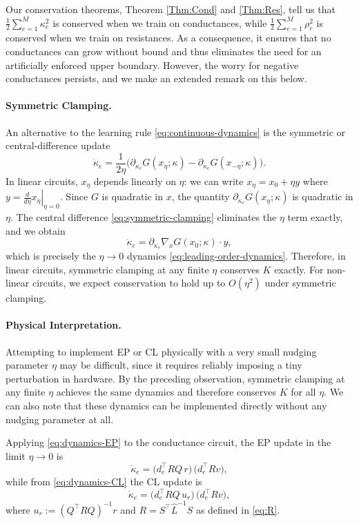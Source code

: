 \documentclass[final, 11pt, nonatbib]{elsarticle}
\theoremstyle{definition}
\theoremstyle{plain}
\numberwithin{equation}{section}
\begin{document}
Our conservation theorems, Theorem \ref{Thm:Cond} and \ref{Thm:Res}, tell us that 
$
    \frac{1}{2}\sum_{e=1}^{M} \kappa_e^2
$
is conserved when we train on conductances, while
$
    \frac{1}{2}\sum_{e=1}^{M} \rho_e^2
$
is conserved when we train on resistances. As a consequence, it ensures that no conductances can grow without bound and thus eliminates the need for an artificially enforced upper boundary. However, the worry for negative conductances persists, and we make an extended remark on this below. 
\paragraph{Symmetric Clamping.}
An alternative to the learning rule \eqref{eq:continuous-dynamics} is the symmetric or central-difference update
\begin{equation}
    \dot{\kappa}_e
    = \dfrac{1}{2\eta}\Big(\partial_{\kappa_e}G(x_\eta;\kappa) - \partial_{\kappa_e}G(x_{-\eta};\kappa)\Big).
    \label{eq:symmetric-clamping}
\end{equation}
In linear circuits, $x_\eta$ depends linearly on $\eta$: we can write $x_\eta = x_0 + \eta y$ where $y = \left.\frac{d}{d\eta}x_\eta\right|_{\eta=0}$. Since $G$ is quadratic in $x$, the quantity $\partial_{\kappa_e}G(x_\eta;\kappa)$ is quadratic in $\eta$. The central difference \eqref{eq:symmetric-clamping} eliminates the $\eta$ term exactly, and we obtain
\[
    \dot{\kappa}_e = \partial_{\kappa_e}\nabla_x G(x_0;\kappa) \cdot y,
\]
which is precisely the $\eta \to 0$ dynamics \eqref{eq:leading-order-dynamics}. Therefore, in linear circuits, symmetric clamping at any finite $\eta$ conserves $K$ exactly. For non-linear circuits, we expect conservation to hold up to $O(\eta^2)$ under symmetric clamping.

\paragraph{Physical Interpretation.}
Attempting to implement EP or CL physically with a very small nudging parameter
$\eta$ may be difficult, since it requires reliably imposing a tiny perturbation
in hardware. By the preceding observation, symmetric clamping at any finite $\eta$ achieves the same dynamics and therefore conserves $K$ for all $\eta$. We can also note that these dynamics can be implemented directly without any nudging parameter at all.

Applying \eqref{eq:dynamics-EP} to the conductance circuit, the EP update in the limit $\eta\to 0$ is
\begin{equation}
    \dot{\kappa}_e
      = \bigl(d_e^\top RQ\, r\bigr)\,
      \bigl(d_e^\top R v\bigr),
      \label{eq:EP-cirucit}
\end{equation}
while from \eqref{eq:dynamics-CL} the CL update is
\begin{equation}
    \dot{\kappa}_e
    = \bigl(d_e^\top RQ\, u_r\bigr)\,
      \bigl(d_e^\top R v\bigr),
      \label{eq:CL-circuit}
\end{equation}
where $u_r := (Q^\top RQ)^{-1} r$ and $R = S^\top \hat{L}^{-1} S$ as defined in \eqref{eq:R}.
\end{document}
